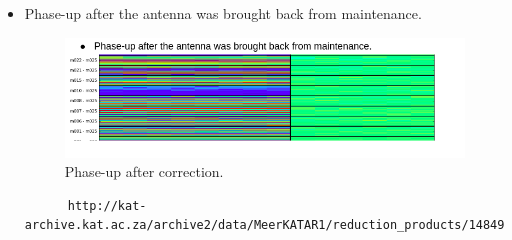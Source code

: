 \documentclass{article}
\begin{document}
{\begin{appendices}
\begin{itemize}
  \begin{lstlisting}
  http://kat-archive.kat.ac.za/archive2/data/MeerKATAR1/reduction_products/1485276360/obs_report_1485274430.h5.html
 
  \end{lstlisting}
	  
	  
	  
	  
	\subsection{M025 status after maintenance and connection on the 21 Jan 2017}:
	 Basic Functionality Pointing report after the antenna was brought back from maintenance. 
	  
	  \begin{lstlisting}
	   http://kat-archive.kat.ac.za/archive2/data/MeerKATAR1/reduction_products/1485276360/obs_report_1485274430.h5.html
	  
	  \end{lstlisting}
	  
	  
	  
	  \item Phase-up after the antenna was brought back from maintenance.
	   \begin{figure}[H]
	  	\centering
	  	\includegraphics[scale=0.33]{m025_phaseup_after.png}
	  	
	  	\caption{Phase-up after correction.}
	  	\label{fig:tilt1}
	  \end{figure}
	  
	  \begin{lstlisting}
	  http://kat-archive.kat.ac.za/archive2/data/MeerKATAR1/reduction_products/1484997010/obs_report_1484996150.h5.html
	  \end{lstlisting}
	  
	  
	  
	  
	  

\end{itemize}
\end{appendices}}
\end{document}
